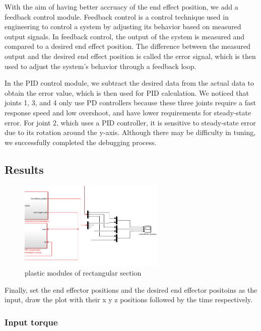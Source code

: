 With the aim of having better accruacy of the end effect position, we add a feedback control module. Feedback control is a control technique used in engineering to control a system by adjusting its behavior based on measured output signals. In feedback control, the output of the system is measured and compared to a desired end effect position. The difference between the measured output and the desired end effect position is called the error signal, which is then used to adjust the system's behavior through a feedback loop.

In the PID control module, we subtract the desired data from the actual data to obtain the error value, which is then used for PID calculation. We noticed that joints 1, 3, and 4 only use PD controllers because these three joints require a fast response speed and low overshoot, and have lower requirements for steady-state error. For joint 2, which uses a PID controller, it is sensitive to steady-state error due to its rotation around the y-axis. Although there may be difficulty in tuning, we successfully completed the debugging process.


\subsection{Results}

\begin{figure}[htbp]
    \centering
    \includegraphics[width=7cm]{./fig/re.png}
    \caption{plastic modules of rectangular section}
    \label{f1}
\end{figure}

Finally, set the end effector positions and the desired end effector positoins as the input, draw the plot with their x y z positions followed by the time respectively.

\subsubsection*{Input torque}

